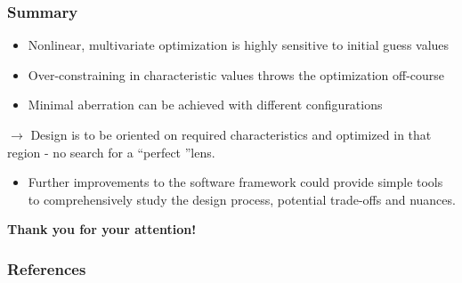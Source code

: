 \documentclass[10pt]{beamer}
\newcommand{\rarrow}{$\rightarrow$ }
\newcommand{\rfn}{\setcounter{footnote}{0}}
\begin{document}
\begin{frame}
  \frametitle{Summary}
  \rfn
  \begin{itemize}
    \item Nonlinear, multivariate optimization is highly sensitive to initial guess values
    \vspace{0.5cm}
    \item Over-constraining in characteristic values throws the optimization off-course
    \vspace{0.5cm}
    \item Minimal aberration can be achieved with different configurations
  \end{itemize}
  \vspace{0.5cm}
  \rarrow Design is to be oriented on required characteristics and optimized in that region - no search for a \textquotedblleft perfect
  \textquotedblright lens.
  \vspace{0.5cm}
  \begin{itemize}
    \item Further improvements to the software framework could provide simple tools to comprehensively study the design process, potential trade-offs and nuances.
  \end{itemize}
  \begin{center}
    \textbf{Thank you for your attention!}
  \end{center}
  \end{frame}

\begin{frame}[allowframebreaks]
  \frametitle{References}
  \printbibliography
\end{frame}
\end{document}
